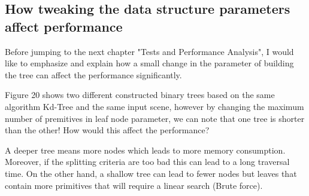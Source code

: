 \documentclass[11pt,a4paper]{article}
\begin{document}
\subsection{How tweaking the data structure parameters affect performance}
Before jumping to the next chapter "Tests and Performance Analysis", I would like to emphasize and explain how a small change in the parameter of building the tree can affect the performance significantly. 
\\
\noindent

Figure 20 shows two different constructed binary trees based on the same algorithm Kd-Tree and the same input scene, however by changing the maximum number of premitives in leaf node parameter, we can note that one tree is shorter than the other! How would this affect the performance? 
\\
\noindent

A deeper tree means more nodes which leads to more memory consumption. Moreover, if the splitting criteria are too bad this can lead to a long traversal time. On the other hand, a shallow tree can lead to fewer nodes but leaves that contain more primitives that will require a linear search (Brute force).    
\end{document}
